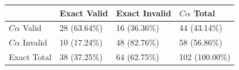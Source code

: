 \begin{tabular}{llll}
\toprule
 & Exact Valid & Exact Invalid & $C\alpha$ Total \\
\midrule
$C\alpha$ Valid & 28 (63.64\%) & 16 (36.36\%) & 44 (43.14\%) \\
$C\alpha$ Invalid & 10 (17.24\%) & 48 (82.76\%) & 58 (56.86\%) \\
Exact Total & 38 (37.25\%) & 64 (62.75\%) & 102 (100.00\%) \\
\bottomrule
\end{tabular}
